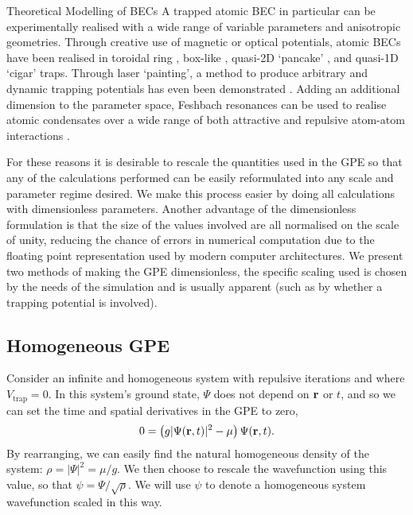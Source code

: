 \begin{chapter}{\label{cha:theoretical_model}Theoretical Modelling of BECs}
	A trapped atomic BEC in particular can be experimentally realised with a wide range of variable parameters and anisotropic geometries. Through creative use of magnetic or optical potentials, atomic BECs have been realised in toroidal ring \cite{persistent,Ramanathan11}, box-like \cite{gaunt_2013,chomaz_2015}, quasi-2D `pancake' \cite{Neely}, and quasi-1D `cigar' \cite{Burger99,Weller08} traps. Through laser `painting', a method to produce arbitrary and dynamic trapping potentials has even been demonstrated \cite{Henderson09}. Adding an additional dimension to the parameter space, Feshbach resonances can be used to realise atomic condensates over a wide range of both attractive and repulsive atom-atom interactions \cite{Inouye1998}.

	For these reasons it is desirable to rescale the quantities used in the GPE so that any of the calculations performed can be easily reformulated into any scale and parameter regime desired. We make this process easier by doing all calculations with dimensionless parameters. Another advantage of the dimensionless formulation is that the size of the values involved are all normalised on the scale of unity, reducing the chance of errors in numerical computation due to the floating point representation used by modern computer architectures.
	We present two methods of making the GPE dimensionless, the specific scaling used is chosen by the needs of the simulation and is usually apparent (such as by whether a trapping potential is involved).

	\subsection{\label{section:gpedimlesshomg} Homogeneous GPE}
		Consider an infinite and homogeneous system with repulsive iterations and where $V_{\mathrm{trap}} = 0$. In this system's ground state, $\Psi$ does not depend on ${\bf r}$ or $t$, and so we can set the time and spatial derivatives in the GPE to zero,
		\begin{equation}
		0 = \left(g|\Psi({\bf r},t)|^2 - \mu \right) \Psi({\bf r},t).
		\end{equation}
		By rearranging, we can easily find the natural homogeneous density of the system: $\rho = |\Psi|^2 = \mu/g$. We then choose to rescale the wavefunction using this value, so that $\psi = \Psi/\sqrt{\rho}$. We will use $\psi$ to denote a homogeneous system wavefunction scaled in this way.


\end{chapter}
